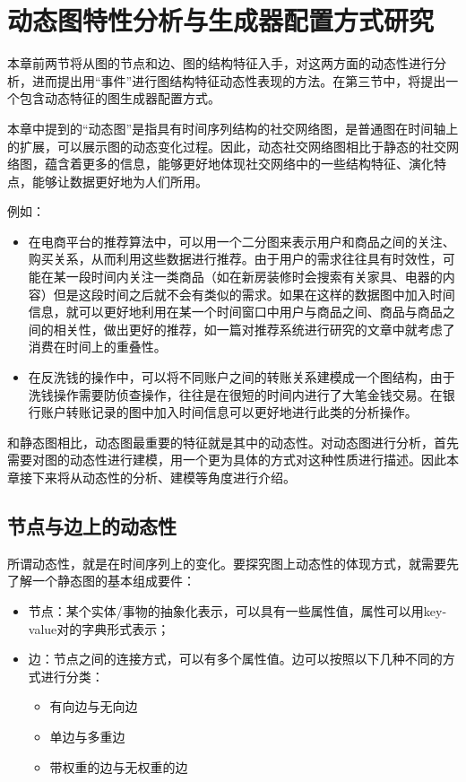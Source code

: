 
\chapter{动态图特性分析与生成器配置方式研究}
\label{cha:chapter02}

本章前两节将从图的节点和边、图的结构特征入手，对这两方面的动态性进行分析，进而提出用“事件”进行图结构特征动态性表现的方法。在第三节中，将提出一个包含动态特征的图生成器配置方式。

本章中提到的“动态图”是指具有时间序列结构的社交网络图，是普通图在时间轴上的扩展，可以展示图的动态变化过程。因此，动态社交网络图相比于静态的社交网络图，蕴含着更多的信息，能够更好地体现社交网络中的一些结构特征、演化特点，能够让数据更好地为人们所用。

例如：

\begin{itemize}
    \item 在电商平台的推荐算法中，可以用一个二分图来表示用户和商品之间的关注、购买关系，从而利用这些数据进行推荐\cite{7009419}。由于用户的需求往往具有时效性，可能在某一段时间内关注一类商品（如在新房装修时会搜索有关家具、电器的内容）但是这段时间之后就不会有类似的需求。如果在这样的数据图中加入时间信息，就可以更好地利用在某一个时间窗口中用户与商品之间、商品与商品之间的相关性，做出更好的推荐，如一篇对推荐系统进行研究的文章\cite{NAJAFABADI2019526}中就考虑了消费在时间上的重叠性。
    \item 在反洗钱的操作中，可以将不同账户之间的转账关系建模成一个图结构，由于洗钱操作需要防侦查操作，往往是在很短的时间内进行了大笔金钱交易。在银行账户转账记录的图中加入时间信息可以更好地进行此类的分析操作\cite{pareja2019evolvegcn}。
\end{itemize}

\vspace{0.2cm}

和静态图相比，动态图最重要的特征就是其中的动态性。对动态图进行分析，首先需要对图的动态性进行建模，用一个更为具体的方式对这种性质进行描述。因此本章接下来将从动态性的分析、建模等角度进行介绍。

\section{节点与边上的动态性}
\label{cha:node_edge_dynamic}

所谓动态性，就是在时间序列上的变化。要探究图上动态性的体现方式，就需要先了解一个静态图的基本组成要件：

\begin{itemize}
    \item 节点：某个实体/事物的抽象化表示，可以具有一些属性值，属性可以用key-value对的字典形式表示；
    \item 边：节点之间的连接方式，可以有多个属性值。边可以按照以下几种不同的方式进行分类：
    \begin{itemize}
        \item 有向边与无向边
        \item 单边与多重边
        \item 带权重的边与无权重的边
    \end{itemize}
\end{itemize}

